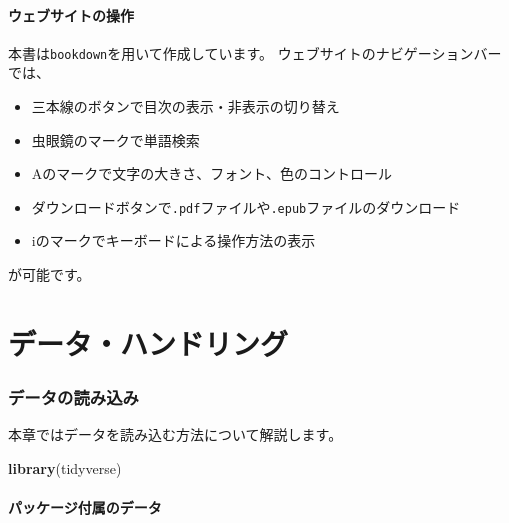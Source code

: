 \documentclass[]{bxjsarticle}
\newenvironment{Shaded}{\begin{snugshade}}{\end{snugshade}}
\newcommand{\KeywordTok}[1]{\textcolor[rgb]{0.13,0.29,0.53}{\textbf{#1}}}
\newcommand{\NormalTok}[1]{#1}
\providecommand{\tightlist}{%
  \setlength{\itemsep}{0pt}\setlength{\parskip}{0pt}}
\begin{document}
\hypertarget{ux30a6ux30a7ux30d6ux30b5ux30a4ux30c8ux306eux64cdux4f5c}{%
\subsection*{ウェブサイトの操作}\label{ux30a6ux30a7ux30d6ux30b5ux30a4ux30c8ux306eux64cdux4f5c}}

本書は\texttt{bookdown}を用いて作成しています。
ウェブサイトのナビゲーションバーでは、

\begin{itemize}
\tightlist
\item
  三本線のボタンで目次の表示・非表示の切り替え
\item
  虫眼鏡のマークで単語検索
\item
  Aのマークで文字の大きさ、フォント、色のコントロール
\item
  ダウンロードボタンで\texttt{.pdf}ファイルや\texttt{.epub}ファイルのダウンロード
\item
  iのマークでキーボードによる操作方法の表示
\end{itemize}

が可能です。

\hypertarget{part-ux30c7ux30fcux30bfux30cfux30f3ux30c9ux30eaux30f3ux30b0}{%
\part{データ・ハンドリング}\label{part-ux30c7ux30fcux30bfux30cfux30f3ux30c9ux30eaux30f3ux30b0}}

\hypertarget{data-import}{%
\section{データの読み込み}\label{data-import}}

本章ではデータを読み込む方法について解説します。

\begin{Shaded}
\begin{Highlighting}[]
\KeywordTok{library}\NormalTok{(tidyverse)}
\end{Highlighting}
\end{Shaded}

\hypertarget{ux30d1ux30c3ux30b1ux30fcux30b8ux4ed8ux5c5eux306eux30c7ux30fcux30bf}{%
\subsection{パッケージ付属のデータ}\label{ux30d1ux30c3ux30b1ux30fcux30b8ux4ed8ux5c5eux306eux30c7ux30fcux30bf}}
\end{document}
